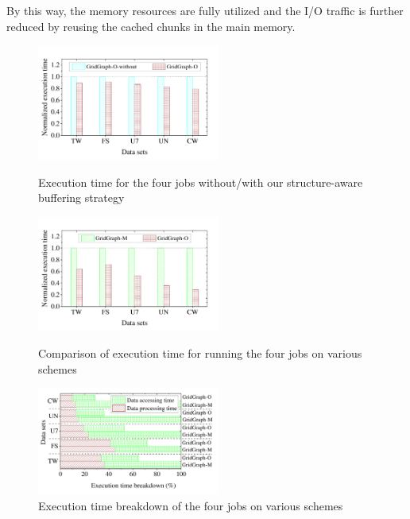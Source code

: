 \documentclass[10pt,journal,compsoc]{IEEEtran}
\begin{document}
By this way, the memory resources are fully utilized and the I/O traffic is further reduced by reusing the cached chunks in the main memory.

\begin{figure}[t]
	\begin{minipage}[t]{0.32\linewidth}
		\centering
		\includegraphics[width=6cm]{schedule.pdf}
		\vspace{-0.95cm}
		\caption{Execution time for the four jobs without/with our structure-aware buffering strategy}
		\label{schedule}
	\end{minipage}
	\hfill
	\begin{minipage}[t]{0.32\linewidth}
		\centering
		\includegraphics[width=6cm]{exe_time.pdf}
		\vspace{-0.95cm}
		\caption{Comparison of execution time for running the four jobs on various schemes}
		\label{exe_time}
	\end{minipage}
	\hfill
	\begin{minipage}[t]{0.32\linewidth}
		\centering
		\includegraphics[width=6cm]{breakdown.pdf}
		\vspace{-0.95cm}
		\caption{Execution time breakdown of the four jobs on various schemes}
		\label{breakdown}
	\end{minipage}
	\vspace{-0.6cm}
\end{figure}
\end{document}
